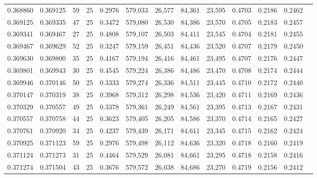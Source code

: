 \begin{tabular}{rrrrrrrrrrrrr}
0.368860 & 0.369125 &    59 &  25 &                                     0.2976 & 579,033 &  26,577 &  84,361 &  23,595 & 0.4703 & 0.2186 & 0.2462 \\
0.369125 & 0.369335 &    47 &  25 &                                     0.3472 & 579,080 &  26,530 &  84,386 &  23,570 & 0.4705 & 0.2183 & 0.2457 \\
0.369341 & 0.369467 &    27 &  25 &                                     0.4808 & 579,107 &  26,503 &  84,411 &  23,545 & 0.4704 & 0.2181 & 0.2455 \\
0.369467 & 0.369629 &    52 &  25 &                                     0.3247 & 579,159 &  26,451 &  84,436 &  23,520 & 0.4707 & 0.2179 & 0.2450 \\
0.369630 & 0.369800 &    35 &  25 &                                     0.4167 & 579,194 &  26,416 &  84,461 &  23,495 & 0.4707 & 0.2176 & 0.2447 \\
0.369801 & 0.369943 &    30 &  25 &                                     0.4545 & 579,224 &  26,386 &  84,486 &  23,470 & 0.4708 & 0.2174 & 0.2444 \\
0.369946 & 0.370146 &    50 &  25 &                                     0.3333 & 579,274 &  26,336 &  84,511 &  23,445 & 0.4710 & 0.2172 & 0.2440 \\
0.370147 & 0.370319 &    38 &  25 &                                     0.3968 & 579,312 &  26,298 &  84,536 &  23,420 & 0.4711 & 0.2169 & 0.2436 \\
0.370329 & 0.370557 &    49 &  25 &                                     0.3378 & 579,361 &  26,249 &  84,561 &  23,395 & 0.4713 & 0.2167 & 0.2431 \\
0.370557 & 0.370758 &    44 &  25 &                                     0.3623 & 579,405 &  26,205 &  84,586 &  23,370 & 0.4714 & 0.2165 & 0.2427 \\
0.370761 & 0.370920 &    34 &  25 &                                     0.4237 & 579,439 &  26,171 &  84,611 &  23,345 & 0.4715 & 0.2162 & 0.2424 \\
0.370925 & 0.371123 &    59 &  25 &                                     0.2976 & 579,498 &  26,112 &  84,636 &  23,320 & 0.4718 & 0.2160 & 0.2419 \\
0.371124 & 0.371273 &    31 &  25 &                                     0.4464 & 579,529 &  26,081 &  84,661 &  23,295 & 0.4718 & 0.2158 & 0.2416 \\
0.371274 & 0.371504 &    43 &  25 &                                     0.3676 & 579,572 &  26,038 &  84,686 &  23,270 & 0.4719 & 0.2156 & 0.2412 \\

\end{tabular}
